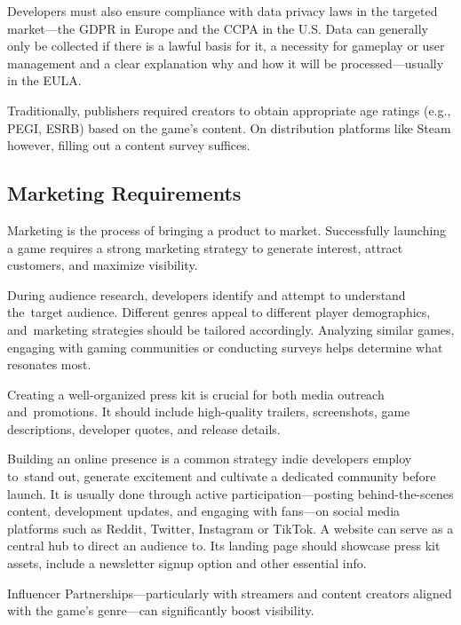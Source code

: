 Developers must also ensure compliance with data privacy laws in the targeted market---the GDPR\cite{eu_gdpr} in Europe and the CCPA\cite{doj_ccpa} in the U.S. Data can generally only be collected if there is a lawful basis for it, a necessity for gameplay or user management and a clear explanation why and how it will be processed---usually in the EULA.\cite{dentons_eu-data-protection, gamota_data-privacy}

Traditionally, publishers required creators to obtain appropriate age ratings (e.g., PEGI, ESRB) based on the game’s content. On distribution platforms like Steam however, filling out a content survey suffices.\cite{steam_content-survey}

\subsection{Marketing Requirements}
Marketing is the process of bringing a product to market. Successfully launching a game requires a strong marketing strategy to generate interest, attract customers, and maximize visibility.

During audience research, developers identify and attempt to understand the~target audience. Different genres appeal to different player demographics, and~marketing strategies should be tailored accordingly. Analyzing similar games, engaging with gaming communities or conducting surveys helps determine what resonates most.\cite{santos_pre-launch}

Creating a well-organized press kit is crucial for both media outreach and~promotions. It should include high-quality trailers, screenshots, game descriptions, developer quotes, and release details.\cite{impress_press-kit}

Building an online presence is a common strategy indie developers employ to~stand out, generate excitement and cultivate a dedicated community before launch. It is usually done through active participation---posting behind-the-scenes content, development updates, and engaging with fans---on social media platforms such as Reddit, Twitter, Instagram or TikTok. A website can serve as a central hub to direct an audience to. Its landing page should showcase press kit assets, include a newsletter signup option and other essential info.\cite{venkatesh_successful-release}

Influencer Partnerships---particularly with streamers and content creators aligned with the game’s genre---can significantly boost visibility.\cite{developer_introduction-to-marketing}

